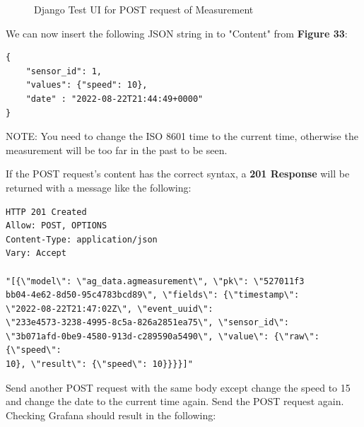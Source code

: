 \documentclass[12pt, letterpaper]{article}
\begin{document}
{{{{{{{{{{{{\begin{figure}[h!]
	\caption{Django Test UI for POST request of Measurement}
	\end{figure}		
\par We can now insert the following JSON string in to "Content" from \textbf{Figure 33}: \\
\begin{verbatim}
{
    "sensor_id": 1,
    "values": {"speed": 10},
    "date" : "2022-08-22T21:44:49+0000"
}
\end{verbatim} 

\newpage \par NOTE: You need to change the ISO 8601 time to the current time, otherwise the measurement will be too far in the past to be seen. \\

\par If the POST request's content has the correct syntax, a \textbf{201 Response} will be returned with a message like the following: \\

\begin{verbatim}
HTTP 201 Created 
Allow: POST, OPTIONS 
Content-Type: application/json
Vary: Accept

"[{\"model\": \"ag_data.agmeasurement\", \"pk\": \"527011f3
bb04-4e62-8d50-95c4783bcd89\", \"fields\": {\"timestamp\":
\"2022-08-22T21:47:02Z\", \"event_uuid\":
\"233e4573-3238-4995-8c5a-826a2851ea75\", \"sensor_id\":
\"3b071afd-0be9-4580-913d-c289590a5490\", \"value\": {\"raw\": {\"speed\":
10}, \"result\": {\"speed\": 10}}}}]"
\end{verbatim}


\newpage \par Send another POST request with the same body except change the speed to 15 and change the date to the current time again. Send the POST request again. Checking Grafana should result in the following: 

}}}}}}}}}}}}
\end{document}
